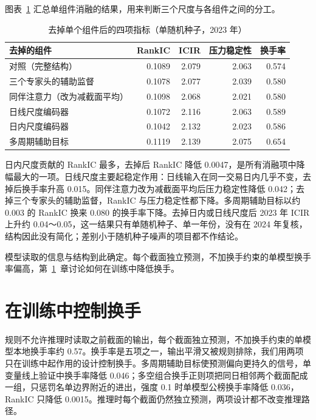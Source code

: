 \documentclass[UTF8,a4paper,zihao=-4,fontset=none]{ctexart}
\newcommand{\tabsetup}{\small\linespread{1.15}\selectfont\renewcommand{\arraystretch}{1.25}}
\newcommand{\figref}[1]{图表~\ref{#1}}
\begin{document}
\figref{tab:ablation} 汇总单组件消融的结果，用来判断三个尺度与各组件之间的分工。

\begin{table}[htbp]
\caption{去掉单个组件后的四项指标（单随机种子，2023 年）}\label{tab:ablation}
\centering\tabsetup
\begin{tabular}{@{}lrrrr@{}}
\toprule
去掉的组件 & RankIC & ICIR & 压力稳定性 & 换手率\\
\midrule
对照（完整结构） & 0.1089 & 2.079 & 2.063 & 0.574\\
三个专家头的辅助监督 & 0.1078 & 2.077 & 2.039 & 0.580\\
同伴注意力（改为减截面平均） & 0.1098 & 2.068 & 2.021 & 0.580\\
日线尺度编码器 & 0.1072 & 2.116 & 2.063 & 0.589\\
日内尺度编码器 & 0.1042 & 2.132 & 2.023 & 0.586\\
多周期辅助目标 & 0.1119 & 2.139 & 2.075 & 0.654\\
\bottomrule
\end{tabular}
\end{table}

日内尺度贡献的 RankIC 最多，去掉后 RankIC 降低 0.0047，是所有消融项中降幅最大的一项。日线尺度主要起稳定作用：日线输入在同一交易日内几乎不变，去掉后换手率升高 0.015。同伴注意力改为减截面平均后压力稳定性降低 0.042；去掉三个专家头的辅助监督，RankIC 与压力稳定性都下降。多周期辅助目标以约 0.003 的 RankIC 换来 0.080 的换手率下降。去掉日内或日线尺度后 2023 年 ICIR 上升约 0.04～0.05，这一结果只有单随机种子、单一年份，没有在 2024 年复核，结构因此没有简化；差别小于随机种子噪声的项目都不作结论。

模型读取的信息与结构到此确定。每个截面独立预测，不加换手约束的单模型换手率偏高，第~\ref{sec:turn}~章讨论如何在训练中降低换手。

\section{在训练中控制换手}\label{sec:turn}

规则不允许推理时读取之前截面的输出，每个截面独立预测，不加换手约束的单模型本地换手率约 0.57。换手率是五项之一，输出平滑又被规则排除，我们用两项只在训练中起作用的设计控制换手。多周期辅助目标使预测偏向更持久的信号，单变量线上验证中换手率降低 0.046；多空组合换手正则项把同日相邻两个截面配成一组，只惩罚名单边界附近的进出，强度 0.1 时单模型公榜换手率降低 0.036，RankIC 只降低 0.0015。推理时每个截面仍然独立预测，两项设计都不改变推理路径。
\end{document}
